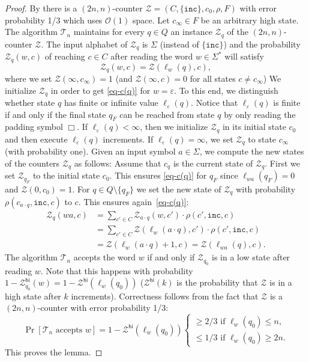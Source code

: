 \documentclass{article}\usepackage[a4paper,margin=20mm]{geometry}
\renewcommand{\O}{\mathcal{O}}
\newcommand{\BZ}{\mathcal{Z}}
\newcommand{\eps}{\varepsilon}
\renewcommand{\geq}{\geqslant}
\renewcommand{\leq}{\leqslant}
\renewcommand{\ge}{\geq}
\renewcommand{\le}{\leq}
\begin{document}
\begin{proof}
By  there is a 
$(2n,n)$-counter $\BZ = (C,\{\mathtt{inc}\},c_0,\rho,F)$ with error probability 1/3 which uses $\O(1)$ space.
Let  $c_{\infty} \in F$ be an arbitrary high state.
The algorithm $\mathcal{T}_n$ maintains for every $q \in Q$ an instance $\BZ_q$ of the $(2n,n)$-counter $\BZ$.
The input alphabet of $\BZ_q$ is $\Sigma$ (instead of $\{\mathtt{inc}\}$) and
the probability $\BZ_q(w,c)$ of reaching $c \in C$ after reading the word $w \in \Sigma^*$ will satisfy
\begin{equation} \label{eq-c(q)}
\BZ_q(w,c) = \BZ(\ell_w(q),c),
\end{equation}
where we set $\BZ(\infty,c_\infty) = 1$ (and $\BZ(\infty,c)=0$ for all states $c \neq c_\infty$)
We initialize $\BZ_q$ in order to get \eqref{eq-c(q)} for $w = \eps$.
To this end, we distinguish whether state $q$ has finite or infinite value $\ell_\eps(q)$.
Notice that $\ell_\eps(q)$ is finite if and only if the final state $q_F$ can be reached from state $q$
by only reading the padding symbol $\Box$.
If $\ell_\eps(q) < \infty$, then we initialize $\BZ_q$ in its initial state $c_0$ and then execute
$\ell_\eps(q)$ increments.
If $\ell_\eps(q) = \infty$, we set $\BZ_q$ to state $c_\infty$ (with probability one).
Given an input symbol $a \in \Sigma$, we compute the new states of the counters
$\BZ_q$ as follows: Assume that $c_q$ is the current state of $\BZ_q$.
First we set $\BZ_{q_F}$ to the initial state $c_0$.
This ensures \eqref{eq-c(q)} for $q_F$ since $\ell_{wa}(q_F) = 0$ and $\BZ(0,c_0) = 1$.
For $q \in Q \setminus \{q_F\}$ we set the new state of $\BZ_q$ with probability $\rho(c_{a \cdot q}, \mathtt{inc}, c)$
to $c$. This ensures again~\eqref{eq-c(q)}:
\begin{align*}
	\BZ_q(wa,c) &= \sum_{c' \in C} \BZ_{a \cdot q}(w,c') \cdot \rho(c',\mathtt{inc},c) \\
	&= \sum_{c' \in C} \BZ(\ell_w(a \cdot q),c') \cdot \rho(c',\mathtt{inc},c) \\
	& = \BZ(\ell_w(a \cdot q)+1,c) = \BZ(\ell_{wa}(q),c).
\end{align*}
The algorithm $\mathcal{T}_n$ accepts the word $w$ if and only if $\BZ_{q_0}$ is in a low state after reading $w$.
Note that this happens with probability $1-\BZ_{q_0}^{\mathsf{hi}}(w) = 1- \BZ^{\mathsf{hi}}(\ell_w(q_0))$ ($\BZ^{\mathsf{hi}}(k)$ is the probability
that $\BZ$ is in a high state after $k$ increments). 
Correctness follows from the fact that $\BZ$ is a $(2n,n)$-counter with error probability 1/3: 
\[ 
\Pr[\mathcal{T}_n \text{ accepts } w] = 1-\BZ^{\mathsf{hi}}(\ell_w(q_0)) 
\begin{cases}
\ge 2/3 \text{ if } \ell_w(q_0) \le n, \\
\le 1/3 \text{ if }  \ell_w(q_0) \ge 2n.
\end{cases}
\]
This proves the lemma.
\end{proof}
\end{document}
